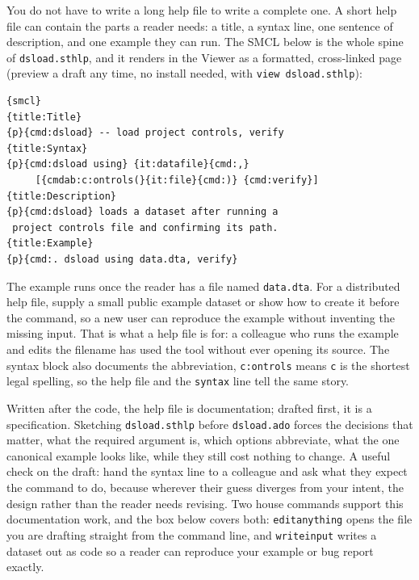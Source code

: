 \documentclass[
    a4paper,
    fontsize=10pt,
    twoside=true,
    numbers=noenddot,
]{kaobook}
\begin{document}
You do not have to write a long help file to write a complete one. A short help file can contain the parts a reader needs: a title, a syntax line, one sentence of description, and one example they can run. The SMCL below is the whole spine of \texttt{dsload.sthlp}, and it renders in the Viewer as a formatted, cross-linked page (preview a draft any time, no install needed, with \texttt{view dsload.sthlp}):
\par
{\footnotesize
\begin{verbatim}
{smcl}
{title:Title}
{p}{cmd:dsload} -- load project controls, verify
{title:Syntax}
{p}{cmd:dsload using} {it:datafile}{cmd:,}
     [{cmdab:c:ontrols(}{it:file}{cmd:)} {cmd:verify}]
{title:Description}
{p}{cmd:dsload} loads a dataset after running a
 project controls file and confirming its path.
{title:Example}
{p}{cmd:. dsload using data.dta, verify}
\end{verbatim}
}
The example runs once the reader has a file named \texttt{data.dta}. For a distributed help file, supply a small public example dataset or show how to create it before the command, so a new user can reproduce the example without inventing the missing input. That is what a help file is for: a colleague who runs the example and edits the filename has used the tool without ever opening its source. The syntax block also documents the abbreviation, \texttt{c:ontrols} means \texttt{c} is the shortest legal spelling, so the help file and the \texttt{syntax} line tell the same story.

Written after the code, the help file is documentation; drafted first, it is a specification. Sketching \texttt{dsload.sthlp} before \texttt{dsload.ado} forces the decisions that matter, what the required argument is, which options abbreviate, what the one canonical example looks like, while they still cost nothing to change. A useful check on the draft: hand the syntax line to a colleague and ask what they expect the command to do, because wherever their guess diverges from your intent, the design rather than the reader needs revising. Two house commands support this documentation work, and the box below covers both: \texttt{editanything} opens the file you are drafting straight from the command line, and \texttt{writeinput} writes a dataset out as code so a reader can reproduce your example or bug report exactly.
\end{document}
